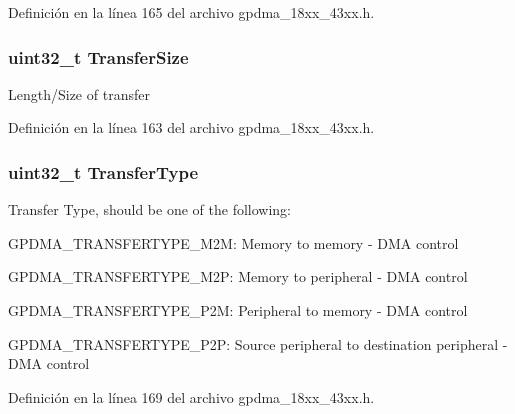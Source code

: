 Definición en la línea 165 del archivo gpdma\+\_\+18xx\+\_\+43xx.\+h.

\subsubsection[{\texorpdfstring{Transfer\+Size}{TransferSize}}]{\setlength{\rightskip}{0pt plus 5cm}uint32\+\_\+t Transfer\+Size}\hypertarget{struct_g_p_d_m_a___c_h___c_f_g___t_aba6866821aad613d4dbe63ecfaff4cb4}{}\label{struct_g_p_d_m_a___c_h___c_f_g___t_aba6866821aad613d4dbe63ecfaff4cb4}
Length/\+Size of transfer 

Definición en la línea 163 del archivo gpdma\+\_\+18xx\+\_\+43xx.\+h.

\subsubsection[{\texorpdfstring{Transfer\+Type}{TransferType}}]{\setlength{\rightskip}{0pt plus 5cm}uint32\+\_\+t Transfer\+Type}\hypertarget{struct_g_p_d_m_a___c_h___c_f_g___t_a711b7e6de8a76224343e9a8f31d5128e}{}\label{struct_g_p_d_m_a___c_h___c_f_g___t_a711b7e6de8a76224343e9a8f31d5128e}
Transfer Type, should be one of the following\+:
\begin{DoxyItemize}
\item G\+P\+D\+M\+A\+\_\+\+T\+R\+A\+N\+S\+F\+E\+R\+T\+Y\+P\+E\+\_\+\+M2M\+: Memory to memory -\/ D\+MA control
\item G\+P\+D\+M\+A\+\_\+\+T\+R\+A\+N\+S\+F\+E\+R\+T\+Y\+P\+E\+\_\+\+M2P\+: Memory to peripheral -\/ D\+MA control
\item G\+P\+D\+M\+A\+\_\+\+T\+R\+A\+N\+S\+F\+E\+R\+T\+Y\+P\+E\+\_\+\+P2M\+: Peripheral to memory -\/ D\+MA control
\item G\+P\+D\+M\+A\+\_\+\+T\+R\+A\+N\+S\+F\+E\+R\+T\+Y\+P\+E\+\_\+\+P2P\+: Source peripheral to destination peripheral -\/ D\+MA control 
\end{DoxyItemize}

Definición en la línea 169 del archivo gpdma\+\_\+18xx\+\_\+43xx.\+h.

